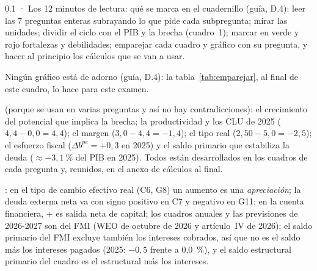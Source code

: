 \begin{complemento}{0.1 · Los 12 minutos de lectura: qué se marca en el cuadernillo}
 (guía, D.4): leer las 7 preguntas enteras subrayando lo que pide cada subpregunta; mirar las unidades; dividir el ciclo con el PIB y la brecha (cuadro~1); marcar en verde y rojo fortalezas y debilidades; emparejar cada cuadro y gráfico con su pregunta, y hacer al principio los cálculos que se van a usar.

 Ningún gráfico está de adorno (guía, D.4): la tabla~\ref{tab:emparejar}, al final de este cuadro, lo hace para este examen.


 (porque se usan en varias preguntas y así no hay contradicciones): el crecimiento del potencial que implica la brecha; la productividad y los CLU de 2025 ($4{,}4-0{,}0=4{,}4$); el margen ($3{,}0-4{,}4=-1{,}4$); el tipo real ($2{,}50-5{,}0=-2{,}5$); el esfuerzo fiscal ($\Delta b^{pe}=+0{,}3$ en 2025) y el saldo primario que estabiliza la deuda ($\approx-3{,}1~\%$ del PIB en 2025). Todos están desarrollados en los cuadros de cada pregunta y, reunidos, en el anexo de cálculos al final.

: en el tipo de cambio efectivo real (C6, G8) un aumento es una \emph{apreciación}; la deuda externa neta va con signo positivo en C7 y negativo en G11; en la cuenta financiera, $+$ es salida neta de capital; los cuadros anuales y las previsiones de 2026-2027 son del FMI (WEO de octubre de 2026 y artículo~IV de 2026); el saldo primario del FMI excluye también los intereses cobrados, así que no es el saldo más los intereses pagados (2025: $-0{,}5$ frente a 0,0~\%), y el saldo estructural primario del cuadro es el estructural más los intereses.


\end{complemento}
